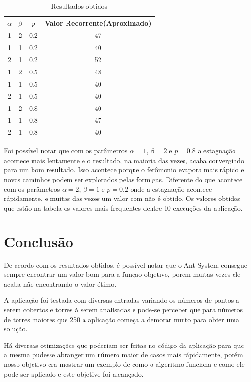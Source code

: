 \documentclass[12pt]{article}
\begin{document}
\begin{table}

\centering

\caption{Resultados obtidos}
\begin{tabular}{cccc}

\hline
$\alpha$ & $\beta$ & $p$ & Valor Recorrente(Aproximado)\\

\hline
\hline

1 & 2 & 0.2 & 47 \\
1 & 1 & 0.2 & 40 \\
2 & 1 & 0.2 & 52 \\
1 & 2 & 0.5 & 48 \\
1 & 1 & 0.5 & 40 \\
2 & 1 & 0.5 & 40 \\
1 & 2 & 0.8 & 40 \\
1 & 1 & 0.8 & 47 \\
2 & 1 & 0.8 & 40 \\

\hline
\end{tabular}
\label{tab2}
\end{table}

Foi possível notar que com os parâmetros $\alpha=1$, $\beta=2$ e $p=0.8$ a estagnação
acontece mais lentamente e o resultado, na maioria das vezes, acaba convergindo
para um bom resultado. Isso acontece porque o ferômonio evapora mais rápido e novos
caminhos podem ser explorados pelas formigas.
Diferente do que acontece com os parâmetros $\alpha=2$, $\beta=1$ e $p=0.2$ onde a 
estagnação acontece rápidamente, e muitas das vezes um valor com não é obtido.
Os valores obtidos que estão na tabela os valores mais frequentes dentre
10 execuções da aplicação.

\section{Conclusão}

De acordo com os resultados obtidos, é possível notar que
o Ant System consegue sempre encontrar um valor bom para 
a função objetivo, porém muitas vezes ele acaba não encontrando 
o valor ótimo.

A aplicação foi testada com diversas entradas variando os números de pontos 
a serem cobertos e torres à serem analisadas e pode-se perceber que
para números de torres maiores que 250 a aplicação começa a demorar muito
para obter uma solução.

Há diversas otimizações que poderiam ser feitas no código da aplicação
para que a mesma pudesse abranger um número maior de casos mais rápidamente,
porém nosso objetivo era mostrar um exemplo de como o algoritmo funciona e 
como ele pode ser aplicado e este objetivo foi alcançado.



\end{document}
